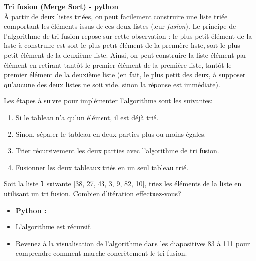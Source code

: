 \begin{Exercice} [30 minutes] \textbf{Tri fusion (Merge Sort) - python} \\
    À partir de deux listes triées, on peut facilement construire une liste triée comportant les éléments issus de ces deux listes (leur \textit{fusion}). Le principe de l'algorithme de tri fusion repose sur cette observation : le plus petit élément de la liste à construire est soit le plus petit élément de la première liste, soit le plus petit élément de la deuxième liste. Ainsi, on peut construire la liste élément par élément en retirant tantôt le premier élément de la première liste, tantôt le premier élément de la deuxième liste (en fait, le plus petit des deux, à supposer qu'aucune des deux listes ne soit vide, sinon la réponse est immédiate). 
    
    Les étapes à suivre pour implémenter l'algorithme sont les suivantes:
    \begin{enumerate}
        \item Si le tableau n'a qu'un élément, il est déjà trié.
        \item Sinon, séparer le tableau en deux parties plus ou moins égales.
        \item Trier récursivement les deux parties avec l'algorithme de tri fusion.
        \item Fusionner les deux tableaux triés en un seul tableau trié.
    \end{enumerate}
    
    Soit la liste \lstinline{l} suivante [38, 27, 43, 3, 9, 82, 10], triez les éléments de la liste en utilisant un tri fusion. Combien d'itération effectuez-vous?
    
    \begin{itemize}
        \item \textbf{Python :}
            
    \end{itemize}
    
    \begin{conseil}
    \begin{itemize}
        \item L'algorithme est récursif. 
        \item Revenez à la visualisation de l'algorithme dans les diapositives 83 à 111 pour comprendre comment marche concrètement le tri fusion. 
    \end{itemize}
    
    \end{conseil}
    

\end{Exercice}
